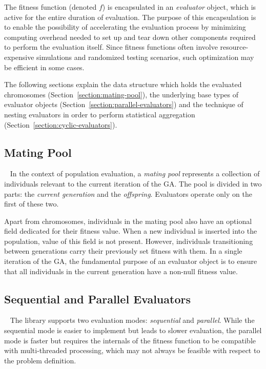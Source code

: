 The fitness function (denoted $f$) is encapsulated in an \textit{evaluator} object, which is active for the entire duration of evaluation. The purpose of this encapsulation is to enable the possibility of accelerating the evaluation process by minimizing computing overhead needed to set up and tear down other components required to perform the evaluation itself. Since fitness functions often involve resource-expensive simulations and randomized testing scenarios, such optimization may be efficient in some cases.

The following sections explain the data structure which holds the evaluated chromosomes (Section~\ref{section:mating-pool}), the underlying base types of evaluator objects (Section~\ref{section:parallel-evaluators}) and the technique of nesting evaluators in order to perform statistical aggregation (Section~\ref{section:cyclic-evaluators}).

\subsection{Mating Pool}~\label{section:mating-pool}
In the context of population evaluation, a \textit{mating pool} represents a collection of individuals relevant to the current iteration of the GA. The pool is divided in two parts: the \textit{current generation} and the \textit{offspring}. Evaluators operate only on the first of these two.

Apart from chromosomes, individuals in the mating pool also have an optional field dedicated for their fitness value. When a new individual is inserted into the population, value of this field is not present. However, individuals transitioning between generations carry their previously set fitness with them. In a single iteration of the GA, the fundamental purpose of an evaluator object is to ensure that all individuals in the current generation have a non-null fitness value.

\subsection{Sequential and Parallel Evaluators}~\label{section:parallel-evaluators}
The library supports two evaluation modes: \textit{sequential} and \textit{parallel}. While the sequential mode is easier to implement but leads to slower evaluation, the parallel mode is faster but requires the internals of the fitness function to be compatible with multi-threaded processing, which may not always be feasible with respect to the problem definition.

